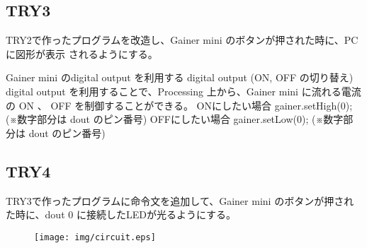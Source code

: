 \documentclass[11pt,a4paper]{jarticle}
\begin{document}
\subsection*{TRY3}
 TRY2で作ったプログラムを改造し、Gainer mini のボタンが押された時に、PCに図形が表示
されるようにする。

Gainer mini のdigital output を利用する
digital output (ON, OFF の切り替え)
 digital output を利用することで、Processing 上から、Gainer mini に流れる電流の ON 、
OFF を制御することができる。
ONにしたい場合
gainer.setHigh(0);
(※数字部分は dout のピン番号)
OFFにしたい場合
gainer.setLow(0);
(※数字部分は dout のピン番号)

\subsection*{TRY4}
 TRY3で作ったプログラムに命令文を追加して、Gainer mini のボタンが押された時に、dout 0
に接続したLEDが光るようにする。


\begin{figure}[h]
 \centering
 \texttt{[image: img/circuit.eps]}
\end{figure}
\end{document}

